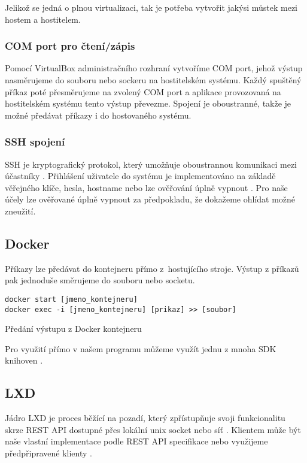 Jelikož se jedná o plnou virtualizaci, tak je potřeba vytvořit jakýsi můstek mezi hostem a hostitelem.

\subsubsection{COM port pro čtení/zápis}

Pomocí VirtualBox administračního rozhraní vytvoříme COM port, jehož výstup nasměrujeme do souboru nebo sockeru na hostitelském systému.
Každý spuštěný příkaz poté přesměrujeme na zvolený COM port a aplikace provozovaná na hostitelském systému tento výstup převezme.
Spojení je oboustranné, takže je možné předávat příkazy i do hostovaného systému.
\cite{virtualbox_serial}

\subsubsection{SSH spojení}

SSH je kryptografický protokol, který umožňuje oboustrannou komunikaci mezi účastníky \cite{ssh_rfc}.
Přihlášení uživatele do systému je implementováno na základě věřejného klíče, hesla, hostname nebo lze ověřování úplně vypnout \cite{ssh_auth_rfc}.
Pro naše účely lze ověřované úplně vypnout za předpokladu, že dokažeme ohlídat možné zneužití.

\subsection{Docker}

Příkazy lze předávat do kontejneru přímo z~hostujícího stroje.
Výstup z příkazů pak jednoduše směrujeme do souboru nebo socketu.

\begin{listing}[ht]
\begin{verbatim}
docker start [jmeno_kontejneru]
docker exec -i [jmeno_kontejneru] [prikaz] >> [soubor]
\end{verbatim}
\caption{Předání výstupu z Docker kontejneru}
\end{listing}

Pro využití přímo v našem programu můžeme využít jednu z mnoha SDK knihoven \cite{docker_sdk}.

\subsection{LXD}

Jádro LXD je proces běžící na pozadí, který zpřístupňuje svoji funkcionalitu skrze REST API dostupné přes lokální unix socket nebo síť \cite{lxd}.
Klientem může být naše vlastní implementace podle REST API specifikace nebo využijeme předpřipravené klienty \cite{lxd_rest}.

